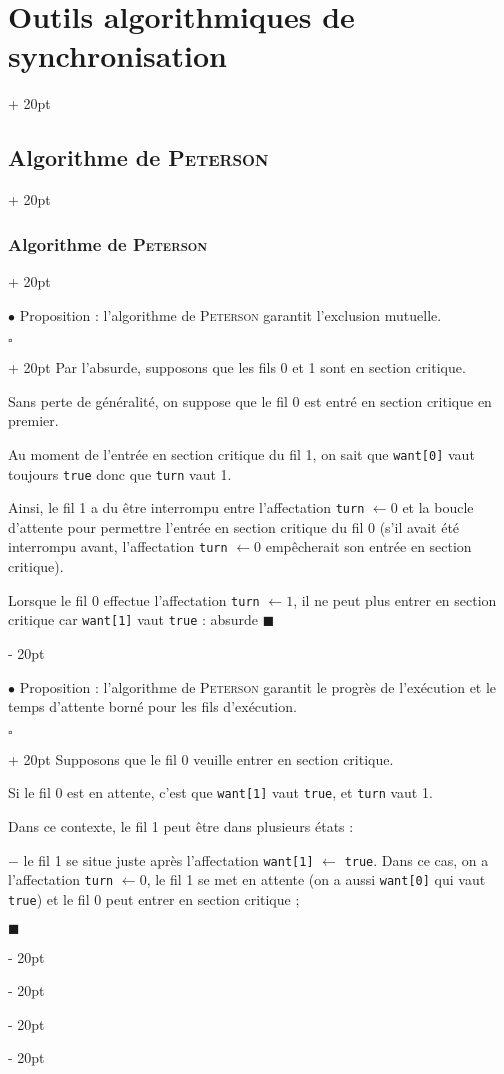 \documentclass[a4paper, 12pt, twoside]{article}
\newcommand{\ind}[1][20pt]{\advance\leftskip + #1}
\newcommand{\deind}[1][20pt]{\advance\leftskip - #1}
\newenvironment{indt}[2][20pt]{#2 \par \ind[#1]}{\par \deind} %
\newenvironment{proof}[1][{}]{\begin{indt}{$\square$ #1}}{$\blacksquare$ \end{indt}}
\begin{document}
\begin{indt}{\section{Outils algorithmiques de synchronisation}}
\begin{indt}{\subsection{Algorithme de \textsc{Peterson}}}
\begin{indt}{\subsubsection{Algorithme de \textsc{Peterson}}}
                \vspace{12pt}
                
                $\bullet$ Proposition : l'algorithme de \textsc{Peterson} garantit l'exclusion mutuelle.

                \begin{proof}
                    Par l'absurde, supposons que les fils 0 et 1 sont en section critique.

                    Sans perte de généralité, on suppose que le fil 0 est entré en section critique en premier.

                    Au moment de l'entrée en section critique du fil 1, on sait que \texttt{want[0]} vaut toujours \texttt{true} donc que \texttt{turn} vaut 1.

                    Ainsi, le fil 1 a du être interrompu entre l'affectation \texttt{turn} $\leftarrow 0$ et la boucle d'attente pour permettre l'entrée en section critique du fil 0 (s'il avait été interrompu avant, l'affectation \texttt{turn} $\leftarrow 0$ empêcherait son entrée en section critique).

                    Lorsque le fil 0 effectue l'affectation \texttt{turn} $\leftarrow 1$, il ne peut plus entrer en section critique car \texttt{want[1]} vaut \texttt{true} : absurde
                \end{proof}

                \vspace{12pt}
                
                $\bullet$ Proposition : l'algorithme de \textsc{Peterson} garantit le progrès de l'exécution et le temps d'attente borné pour les fils d'exécution.

                \begin{proof}
                    Supposons que le fil 0 veuille entrer en section critique.

                    Si le fil 0 est en attente, c'est que \texttt{want[1]} vaut \texttt{true}, et \texttt{turn} vaut 1.

                    Dans ce contexte, le fil 1 peut être dans plusieurs états :

                    $-$ le fil 1 se situe juste après l'affectation \texttt{want[1]} $\leftarrow$ \texttt{true}. Dans ce cas, on a l'affectation \texttt{turn} $\leftarrow 0$, le fil 1 se met en attente (on a aussi \texttt{want[0]} qui vaut \texttt{true}) et le fil 0 peut entrer en section critique ;


\end{proof}
\end{indt}
\end{indt}
\end{indt}
\end{document}
